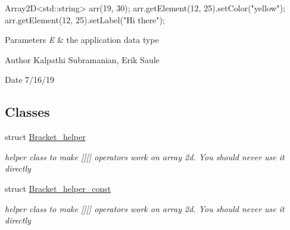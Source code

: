 \begin{DoxyCode}
Array2D<std::string> arr(19, 30);
arr.getElement(12, 25).setColor(\textcolor{stringliteral}{"yellow"});
arr.getElement(12, 25).setLabel(\textcolor{stringliteral}{"Hi there"});
\end{DoxyCode}



\begin{DoxyParams}{Parameters}
{\em E} & the application data type\\
\hline
\end{DoxyParams}
\begin{DoxyAuthor}{Author}
Kalpathi Subramanian, Erik Saule 
\end{DoxyAuthor}
\begin{DoxyDate}{Date}
7/16/19 
\end{DoxyDate}
\subsection*{Classes}
\begin{DoxyCompactItemize}
\item 
struct \hyperlink{structbridges_1_1datastructure_1_1_array2_d_1_1_bracket__helper}{Bracket\+\_\+helper}
\begin{DoxyCompactList}\small\item\em helper class to make \mbox{[}\mbox{]}\mbox{[}\mbox{]} operators work on array 2d. You should never use it directly \end{DoxyCompactList}\item 
struct \hyperlink{structbridges_1_1datastructure_1_1_array2_d_1_1_bracket__helper__const}{Bracket\+\_\+helper\+\_\+const}
\begin{DoxyCompactList}\small\item\em helper class to make \mbox{[}\mbox{]}\mbox{[}\mbox{]} operators work on array 2d. You should never use it directly \end{DoxyCompactList}\end{DoxyCompactItemize}
